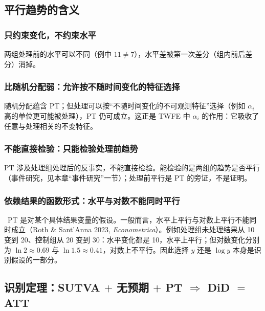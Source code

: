 \subsection{平行趋势的含义}

\subsubsection{只约束变化，不约束水平}

两组处理前的水平可以不同（例中 $11\neq7$），水平差被第一次差分（组内前后差分）消掉。

\subsubsection{比随机分配弱：允许按不随时间变化的特征选择}

随机分配蕴含 PT；但处理可以按“不随时间变化的不可观测特征”选择（例如 $\alpha_i$ 高的单位更可能被处理），PT 仍可成立。这正是 TWFE 中 $\alpha_i$ 的作用：它吸收了任意与处理相关的不变特征。

\subsubsection{不能直接检验：只能检验处理前趋势}

PT 涉及处理组处理后的反事实，不能直接检验。能检验的是两组的趋势是否平行（事件研究，见本章“事件研究”一节）；处理前平行是 PT 的旁证，不是证明。

\subsubsection{依赖结果的函数形式：水平与对数不能同时平行}

\tagext\ PT 是对某个具体结果变量的假设。一般而言，水平上平行与对数上平行不能同时成立（Roth \& Sant'Anna 2023, \textit{Econometrica}）。例如处理组未处理结果从 10 变到 20、控制组从 20 变到 30：水平变化都是 10，水平上平行；但对数变化分别为 $\ln2\approx0.69$ 与 $\ln1.5\approx0.41$，对数上不平行。因此选择 $y$ 还是 $\log y$ 本身是识别假设的一部分。

\subsection{识别定理：SUTVA \texorpdfstring{$+$}{+} 无预期 \texorpdfstring{$+$}{+} PT \texorpdfstring{$\Rightarrow$}{=>} DiD \texorpdfstring{$=$}{=} ATT}

